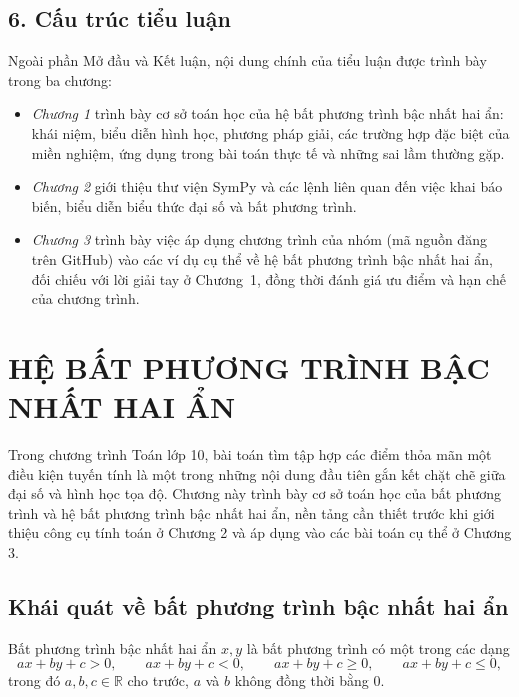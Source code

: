 \documentclass[12pt,a4paper]{report}
\begin{document}
\section*{6. Cấu trúc tiểu luận}

Ngoài phần Mở đầu và Kết luận, nội dung chính của tiểu luận được trình bày trong ba chương:

\begin{itemize}
\item \textit{Chương 1} trình bày cơ sở toán học của hệ bất phương trình bậc nhất hai ẩn: khái niệm, biểu diễn hình học, phương pháp giải, các trường hợp đặc biệt của miền nghiệm, ứng dụng trong bài toán thực tế và những sai lầm thường gặp.
\item \textit{Chương 2} giới thiệu thư viện SymPy và các lệnh liên quan đến việc khai báo biến, biểu diễn biểu thức đại số và bất phương trình.
\item \textit{Chương 3} trình bày việc áp dụng chương trình của nhóm (mã nguồn đăng trên GitHub) vào các ví dụ cụ thể về hệ bất phương trình bậc nhất hai ẩn, đối chiếu với lời giải tay ở Chương~1, đồng thời đánh giá ưu điểm và hạn chế của chương trình.
\end{itemize}

\clearpage
{}

\chapter{HỆ BẤT PHƯƠNG TRÌNH BẬC NHẤT HAI ẨN}
\label{chap:hpt}

Trong chương trình Toán lớp 10, bài toán tìm tập hợp các điểm thỏa mãn một điều kiện tuyến tính là một trong những nội dung đầu tiên gắn kết chặt chẽ giữa đại số và hình học tọa độ. Chương này trình bày cơ sở toán học của bất phương trình và hệ bất phương trình bậc nhất hai ẩn, nền tảng cần thiết trước khi giới thiệu công cụ tính toán ở Chương 2 và áp dụng vào các bài toán cụ thể ở Chương 3.

\section{Khái quát về bất phương trình bậc nhất hai ẩn}
\label{sec:1.1}

\begin{definitionbox}
Bất phương trình bậc nhất hai ẩn $x,y$ là bất phương trình có một trong các dạng
\[
ax+by+c>0,\qquad ax+by+c<0,\qquad ax+by+c\ge 0,\qquad ax+by+c\le 0,
\]
trong đó $a,b,c\in\mathbb{R}$ cho trước, $a$ và $b$ không đồng thời bằng $0$.
\end{definitionbox}
\end{document}
